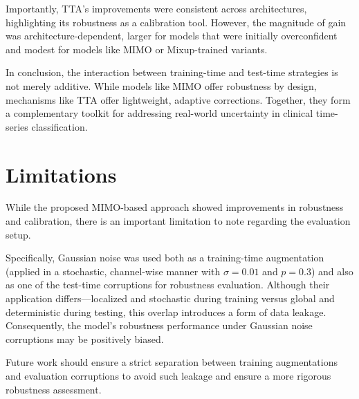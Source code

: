 Importantly, TTA's improvements were consistent across architectures, highlighting its robustness as a calibration tool. However, the magnitude of gain was architecture-dependent, larger for models that were initially overconfident and modest for models like MIMO or Mixup-trained variants.

In conclusion, the interaction between training-time and test-time strategies is not merely additive. While models like MIMO offer robustness by design, mechanisms like TTA offer lightweight, adaptive corrections. Together, they form a complementary toolkit for addressing real-world uncertainty in clinical time-series classification.

\section{Limitations}
\label{sec:limitations}
While the proposed MIMO-based approach showed improvements in robustness and calibration, there is an important limitation to note regarding the evaluation setup.

Specifically, Gaussian noise was used both as a training-time augmentation (applied in a stochastic, channel-wise manner with $\sigma=0.01$ and $p=0.3$) and also as one of the test-time corruptions for robustness evaluation. Although their application differs—localized and stochastic during training versus global and deterministic during testing, this overlap introduces a form of data leakage. Consequently, the model's robustness performance under Gaussian noise corruptions may be positively biased.

Future work should ensure a strict separation between training augmentations and evaluation corruptions to avoid such leakage and ensure a more rigorous robustness assessment.